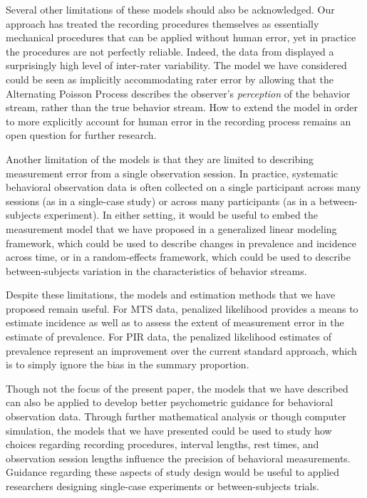 \documentclass[man, noextraspace, floatsintext]{apa6}\usepackage[]{graphicx}\usepackage[]{color}
\begin{document}
Several other limitations of these models should also be acknowledged. Our approach has treated the recording procedures themselves as essentially mechanical procedures that can be applied without human error, yet in practice the procedures are not perfectly reliable. Indeed, the data from \citet{Johnson2014} displayed a surprisingly high level of inter-rater variability. The model we have considered could be seen as implicitly accommodating rater error by allowing that the Alternating Poisson Process describes the observer's \textit{perception} of the behavior stream, rather than the true behavior stream. How to extend the model in order to more explicitly account for human error in the recording process remains an open question for further research.

Another limitation of the models is that they are limited to describing measurement error from a single observation session. In practice, systematic behavioral observation data is often collected on a single participant across many sessions (as in a single-case study) or across many participants (as in a between-subjects experiment). In either setting, it would be useful to embed the measurement model that we have proposed in a generalized linear modeling framework, which could be used to describe changes in prevalence and incidence across time, or in a random-effects framework, which could be used to describe between-subjects variation in the characteristics of behavior streams.

Despite these limitations, the models and estimation methods that we have proposed remain useful. For MTS data, penalized likelihood provides a means to estimate incidence as well as to assess the extent of measurement error in the estimate of prevalence. For PIR data, the penalized likelihood estimates of prevalence represent an improvement over the current standard approach, which is to simply ignore the bias in the summary proportion. 

Though not the focus of the present paper, the models that we have described can also be applied to develop better psychometric guidance for behavioral observation data. Through further mathematical analysis or though computer simulation, the models that we have presented could be used to study how choices regarding recording procedures, interval lengths, rest times, and observation session lengths influence the precision of behavioral measurements. Guidance regarding these aspects of study design would be useful to applied researchers designing single-case experiments or between-subjects trials.
\end{document}
